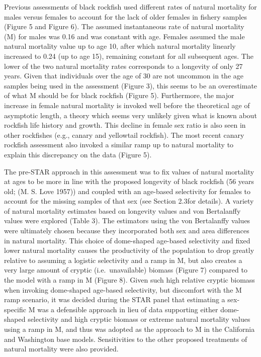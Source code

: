 \documentclass[11pt,
  english,
  letterpaper,
]{article}
\begin{document}
Previous assessments of black rockfish used different rates of natural mortality for males versus females to account for the lack of older females in fishery samples (Figure 5 and Figure 6). The assumed instantaneous rate of natural mortality (M) for males was 0.16 and was constant with age. Females assumed the male natural mortality value up to age 10, after which natural mortality linearly increased to 0.24 (up to age 15), remaining constant for all subsequent ages. The lower of the two natural mortality rates corresponds to a longevity of only 27 years. Given that individuals over the age of 30 are not uncommon in the age samples being used in the assessment (Figure 3), this seems to be an overestimate of what M should be for black rockfish (Figure 5). Furthermore, the major increase in female natural mortality is invoked well before the theoretical age of asymptotic length, a theory which seems very unlikely given what is known about rockfish life history and growth. This decline in female sex ratio is also seen in other rockfishes (e.g., canary and yellowtail rockfish). The most recent canary rockfish assessment also invoked a similar ramp up to natural mortality to explain this discrepancy on the data (Figure 5).

The pre-STAR approach in this assessment was to fix values of natural mortality at ages to be more in line with the proposed longevity of black rockfish (56 years old; (M. S. Love 1957)) and coupled with an age-based selectivity for females to account for the missing samples of that sex (see Section 2.3for details). A variety of natural mortality estimates based on longevity values and von Bertalanffy values were explored (Table 3). The estimators using the von Bertalanffy values were ultimately chosen because they incorporated both sex and area differences in natural mortality. This choice of dome-shaped age-based selectivity and fixed lower natural mortality causes the productivity of the population to drop greatly relative to assuming a logistic selectivity and a ramp in M, but also creates a very large amount of cryptic (i.e.~unavailable) biomass (Figure 7) compared to the model with a ramp in M (Figure 8). Given such high relative cryptic biomass when invoking dome-shaped age-based selectivity, but discomfort with the M ramp scenario, it was decided during the STAR panel that estimating a sex-specific M was a defensible approach in lieu of data supporting either dome-shaped selectivity and high cryptic biomass or extreme natural mortality values using a ramp in M, and thus was adopted as the approach to M in the California and Washington base models. Sensitivities to the other proposed treatments of natural mortality were also provided.
\end{document}

